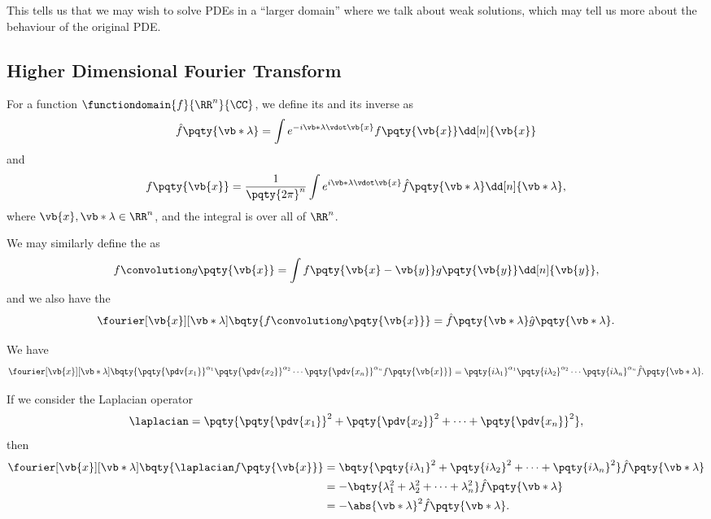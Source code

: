 This tells us that we may wish to solve PDEs in a ``larger domain'' where we talk about weak solutions, which may tell us more about the behaviour of the original PDE.

\normalsize

\subsection{Higher Dimensional Fourier Transform}

For a function \(\functiondomain{f}{\RR^n}{\CC}\), we define its  and its inverse as
\begin{equation}
    \hat{f} \pqty{\vb*{\lambda}} = \int e^{- i \vb*{\lambda} \vdot \vb{x}} f\pqty{\vb{x}} \dd[n]{\vb{x}}
\end{equation}
and
\begin{equation}
    f\pqty{\vb{x}} = \frac{1}{\pqty{2 \pi}^n} \int e^{i \vb*{\lambda} \vdot \vb{x}} \hat{f}\pqty{\vb*{\lambda}} \dd[n]{\vb*{\lambda}},
\end{equation}
where \(\vb{x}, \vb*{\lambda} \in \RR^n\), and the integral is over all of \(\RR^n\).

We may similarly define the  as
\begin{equation}
    f \convolution g\pqty{\vb{x}} = \int f\pqty{\vb{x} - \vb{y}} g\pqty{\vb{y}} \dd[n]{\vb{y}},
\end{equation}
and we also have the 
\begin{equation}
    \fourier[\vb{x}][\vb*{\lambda}] \bqty{f \convolution g \pqty{\vb{x}}} = \hat{f} \pqty{\vb*{\lambda}} \hat{g} \pqty{\vb*{\lambda}}.
\end{equation}

We have
\begin{equation}
    \fourier[\vb{x}][\vb*{\lambda}] \bqty{\pqty{\pdv{x_1}}^{\alpha_1} \pqty{\pdv{x_2}}^{\alpha_2} \cdots \pqty{\pdv{x_n}}^{\alpha_n} f\pqty{\vb{x}}} = \pqty{i \lambda_1}^{\alpha_1} \pqty{i \lambda_2}^{\alpha_2} \cdots \pqty{i \lambda_n}^{\alpha_n} \hat{f}\pqty{\vb*{\lambda}}.
\end{equation}

\begin{example}
    If we consider the Laplacian operator
    \begin{equation}
        \laplacian = \pqty{\pqty{\pdv{x_1}}^2 + \pqty{\pdv{x_2}}^2 + \cdots + \pqty{\pdv{x_n}}^2},
    \end{equation}
    then
    \begin{subequations}
        \begin{align}
            \fourier[\vb{x}][\vb*{\lambda}] \bqty{\laplacian f\pqty{\vb{x}}} &= \bqty{\pqty{i \lambda_1}^2 + \pqty{i \lambda_2}^2 + \cdots + \pqty{i \lambda_n}^2} \hat{f}\pqty{\vb*{\lambda}} \\
            &= - \bqty{\lambda_1^2 + \lambda_2^2 + \cdots + \lambda_n^2} \hat{f}\pqty{\vb*{\lambda}} \\
            &= - \abs{\vb*{\lambda}}^2 \hat{f}\pqty{\vb*{\lambda}}.
        \end{align}
    \end{subequations}
\end{example}

